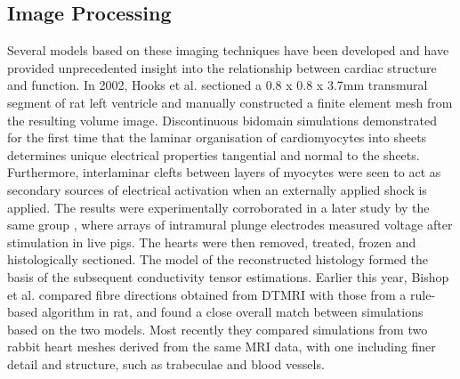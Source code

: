   
  \subsection{Image Processing} %
  \label{sub:image_processing}
  
    Several models based on these imaging techniques have been developed and have provided unprecedented insight into the relationship between cardiac structure and function. In 2002, Hooks et al. \cite{Hooks2002} sectioned a 0.8 x 0.8 x 3.7mm transmural segment of rat left ventricle and manually constructed a finite element mesh from the resulting volume image.  Discontinuous bidomain simulations demonstrated for the first time that the laminar organisation of cardiomyocytes into sheets determines unique electrical properties tangential and normal to the sheets. Furthermore, interlaminar clefts between layers of myocytes were seen to act as secondary sources of electrical activation when an externally applied shock is applied. The results were experimentally corroborated in a later study by the same group \cite{Hooks2007}, where arrays of intramural plunge electrodes measured voltage after stimulation in live pigs. The hearts were then removed, treated, frozen and histologically sectioned. The model of the reconstructed histology formed the basis of the subsequent conductivity tensor estimations. Earlier this year, Bishop et al. \cite{Bishop2009} compared fibre directions obtained from DTMRI with those from a rule-based algorithm in rat, and found a close overall match between simulations based on the two models. Most recently \cite{Bishop2009} they compared simulations from two rabbit heart meshes derived from the same MRI data, with one including finer detail and structure, such as trabeculae and blood vessels.
  
